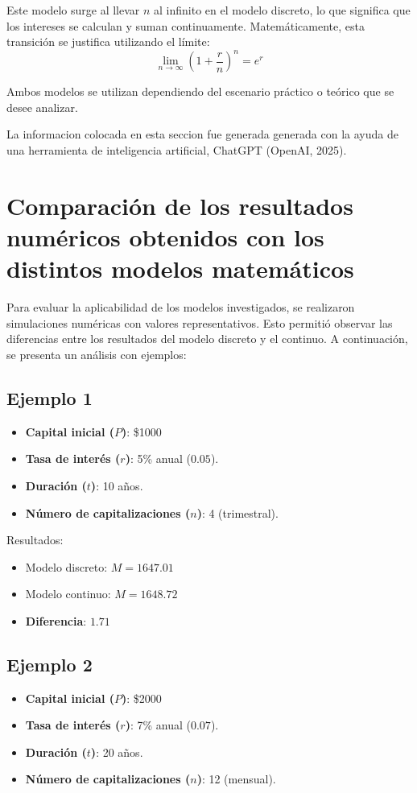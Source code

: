 \documentclass{article}
\begin{document}
Este modelo surge al llevar $n$ al infinito en el modelo discreto, lo que significa que los intereses se calculan y suman continuamente. Matemáticamente, esta transición se justifica utilizando el límite:
\begin{equation}
\lim_{n \to \infty} \left(1 + \frac{r}{n}\right)^n = e^r
\end{equation}

Ambos modelos se utilizan dependiendo del escenario práctico o teórico que se desee analizar.

La informacion colocada en esta seccion fue generada generada con la ayuda de una herramienta de inteligencia artificial, ChatGPT (OpenAI, 2025).

\section{Comparación de los resultados numéricos obtenidos con los distintos modelos matemáticos}
Para evaluar la aplicabilidad de los modelos investigados, se realizaron simulaciones numéricas con valores representativos. Esto permitió observar las diferencias entre los resultados del modelo discreto y el continuo. A continuación, se presenta un análisis con ejemplos:

\subsection{Ejemplo 1}
\begin{itemize}
    \item \textbf{Capital inicial ($P$)}: \$1000
    \item \textbf{Tasa de interés ($r$)}: 5\% anual ($0.05$).
    \item \textbf{Duración ($t$)}: 10 años.
    \item \textbf{Número de capitalizaciones ($n$)}: 4 (trimestral).
\end{itemize}

Resultados:
\begin{itemize}
    \item Modelo discreto: $M = 1647.01$
    \item Modelo continuo: $M = 1648.72$
    \item \textbf{Diferencia}: $1.71$
\end{itemize}

\subsection{Ejemplo 2}
\begin{itemize}
    \item \textbf{Capital inicial ($P$)}: \$2000
    \item \textbf{Tasa de interés ($r$)}: 7\% anual ($0.07$).
    \item \textbf{Duración ($t$)}: 20 años.
    \item \textbf{Número de capitalizaciones ($n$)}: 12 (mensual).
\end{itemize}
\end{document}
